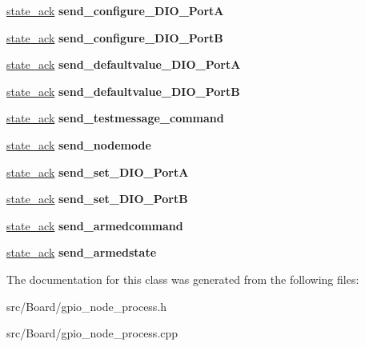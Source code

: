 \begin{DoxyCompactItemize}
\item 
\mbox{\label{classGPIONodeProcess_aa6787e4e08b4041ff07d8365da40d423}} 
\hyperlink{structstate__ack}{state\+\_\+ack} {\bfseries send\+\_\+configure\+\_\+\+D\+I\+O\+\_\+\+PortA}
\item 
\mbox{\label{classGPIONodeProcess_a23c2221f7d569bb2ab3e0d62c8b3f9db}} 
\hyperlink{structstate__ack}{state\+\_\+ack} {\bfseries send\+\_\+configure\+\_\+\+D\+I\+O\+\_\+\+PortB}
\item 
\mbox{\label{classGPIONodeProcess_a53608aac90221ba5bbc27d52b7aa0ecc}} 
\hyperlink{structstate__ack}{state\+\_\+ack} {\bfseries send\+\_\+defaultvalue\+\_\+\+D\+I\+O\+\_\+\+PortA}
\item 
\mbox{\label{classGPIONodeProcess_ac8b97966a4fa2927350ed0b438947949}} 
\hyperlink{structstate__ack}{state\+\_\+ack} {\bfseries send\+\_\+defaultvalue\+\_\+\+D\+I\+O\+\_\+\+PortB}
\item 
\mbox{\label{classGPIONodeProcess_a0512cd193550ee59ed8f9ef455932318}} 
\hyperlink{structstate__ack}{state\+\_\+ack} {\bfseries send\+\_\+testmessage\+\_\+command}
\item 
\mbox{\label{classGPIONodeProcess_ab53678f6d1b5b6767d578a4e82213f2c}} 
\hyperlink{structstate__ack}{state\+\_\+ack} {\bfseries send\+\_\+nodemode}
\item 
\mbox{\label{classGPIONodeProcess_a89019f443c1fd471d99bae06b695d114}} 
\hyperlink{structstate__ack}{state\+\_\+ack} {\bfseries send\+\_\+set\+\_\+\+D\+I\+O\+\_\+\+PortA}
\item 
\mbox{\label{classGPIONodeProcess_a84348173c9e679589fe07d4fc88b56f3}} 
\hyperlink{structstate__ack}{state\+\_\+ack} {\bfseries send\+\_\+set\+\_\+\+D\+I\+O\+\_\+\+PortB}
\item 
\mbox{\label{classGPIONodeProcess_a548f232d6096fda30238aa8c0e392018}} 
\hyperlink{structstate__ack}{state\+\_\+ack} {\bfseries send\+\_\+armedcommand}
\item 
\mbox{\label{classGPIONodeProcess_a6b25e967b48580329f8a4a3e9978aa84}} 
\hyperlink{structstate__ack}{state\+\_\+ack} {\bfseries send\+\_\+armedstate}
\end{DoxyCompactItemize}


The documentation for this class was generated from the following files\+:\begin{DoxyCompactItemize}
\item 
src/\+Board/gpio\+\_\+node\+\_\+process.\+h\item 
src/\+Board/gpio\+\_\+node\+\_\+process.\+cpp\end{DoxyCompactItemize}
